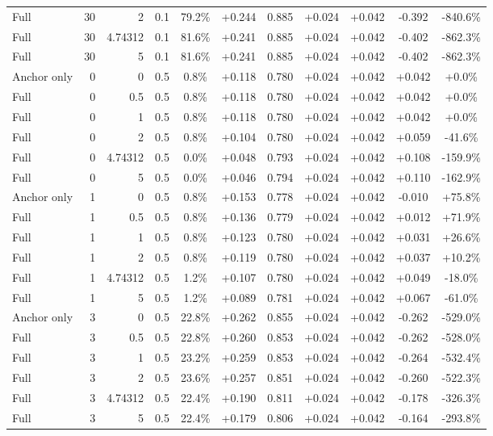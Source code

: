 \begin{table}[htbp]
\begin{tabular}{lrrrccccccc}
Full & 30 & 2 & 0.1 & 79.2\% & +0.244 & 0.885 & +0.024 & +0.042 & -0.392 & -840.6\% \\
Full & 30 & 4.74312 & 0.1 & 81.6\% & +0.241 & 0.885 & +0.024 & +0.042 & -0.402 & -862.3\% \\
Full & 30 & 5 & 0.1 & 81.6\% & +0.241 & 0.885 & +0.024 & +0.042 & -0.402 & -862.3\% \\
Anchor only & 0 & 0 & 0.5 & 0.8\% & +0.118 & 0.780 & +0.024 & +0.042 & +0.042 & +0.0\% \\
Full & 0 & 0.5 & 0.5 & 0.8\% & +0.118 & 0.780 & +0.024 & +0.042 & +0.042 & +0.0\% \\
Full & 0 & 1 & 0.5 & 0.8\% & +0.118 & 0.780 & +0.024 & +0.042 & +0.042 & +0.0\% \\
Full & 0 & 2 & 0.5 & 0.8\% & +0.104 & 0.780 & +0.024 & +0.042 & +0.059 & -41.6\% \\
Full & 0 & 4.74312 & 0.5 & 0.0\% & +0.048 & 0.793 & +0.024 & +0.042 & +0.108 & -159.9\% \\
Full & 0 & 5 & 0.5 & 0.0\% & +0.046 & 0.794 & +0.024 & +0.042 & +0.110 & -162.9\% \\
Anchor only & 1 & 0 & 0.5 & 0.8\% & +0.153 & 0.778 & +0.024 & +0.042 & -0.010 & +75.8\% \\
Full & 1 & 0.5 & 0.5 & 0.8\% & +0.136 & 0.779 & +0.024 & +0.042 & +0.012 & +71.9\% \\
Full & 1 & 1 & 0.5 & 0.8\% & +0.123 & 0.780 & +0.024 & +0.042 & +0.031 & +26.6\% \\
Full & 1 & 2 & 0.5 & 0.8\% & +0.119 & 0.780 & +0.024 & +0.042 & +0.037 & +10.2\% \\
Full & 1 & 4.74312 & 0.5 & 1.2\% & +0.107 & 0.780 & +0.024 & +0.042 & +0.049 & -18.0\% \\
Full & 1 & 5 & 0.5 & 1.2\% & +0.089 & 0.781 & +0.024 & +0.042 & +0.067 & -61.0\% \\
Anchor only & 3 & 0 & 0.5 & 22.8\% & +0.262 & 0.855 & +0.024 & +0.042 & -0.262 & -529.0\% \\
Full & 3 & 0.5 & 0.5 & 22.8\% & +0.260 & 0.853 & +0.024 & +0.042 & -0.262 & -528.0\% \\
Full & 3 & 1 & 0.5 & 23.2\% & +0.259 & 0.853 & +0.024 & +0.042 & -0.264 & -532.4\% \\
Full & 3 & 2 & 0.5 & 23.6\% & +0.257 & 0.851 & +0.024 & +0.042 & -0.260 & -522.3\% \\
Full & 3 & 4.74312 & 0.5 & 22.4\% & +0.190 & 0.811 & +0.024 & +0.042 & -0.178 & -326.3\% \\
Full & 3 & 5 & 0.5 & 22.4\% & +0.179 & 0.806 & +0.024 & +0.042 & -0.164 & -293.8\% \\

\end{tabular}
\end{table}
